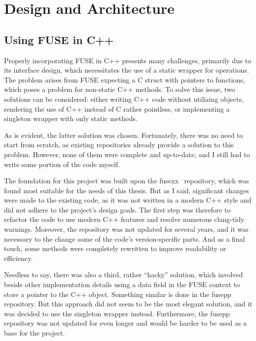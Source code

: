 \chapter{Design and Architecture}
\label{chap:design-and-architecture}


\section{Using FUSE in C++}\label{sec:fuse-in-cpp}

Properly incorporating FUSE in C++ presents many challenges, primarily due to its interface design, which necessitates the use of a static wrapper for operations.
The problem arises from FUSE expecting a C struct with pointers to functions, which poses a problem for non-static C++ methods.
To solve this issue, two solutions can be considered: either writing C++ code without utilizing objects, rendering the use of C++ instead of C rather pointless, or implementing a singleton wrapper with only static methods.

As is evident, the latter solution was chosen.
Fortunately, there was no need to start from scratch, as existing repositories already provide a solution to this problem.
However, none of them were complete and up-to-date, and I still had to write some portion of the code myself.

The foundation for this project was built upon the fusexx~\cite{fusexx} repository, which was found most suitable for the needs of this thesis.
But as I said, significant changes were made to the existing code, as it was not written in a modern C++ style and did not adhere to the project's design goals.
The first step was therefore to refactor the code to use modern C++ features and resolve numerous clang-tidy warnings.
Moreover, the repository was not updated for several years, and it was necessary to the change some of the code's version-specific parts.
And as a final touch, some methods were completely rewritten to improve readability or efficiency.

Needless to say, there was also a third, rather ``hacky'' solution, which involved beside other implementation details using a data field in the FUSE context to store a pointer to the C++ object.
Something similar is done in the fusepp~\cite{fusepp} repository.
But this approach did not seem to be the most elegant solution, and it was decided to use the singleton wrapper instead.
Furthermore, the fusepp repository was not updated for even longer and would be harder to be used as a base for the project.


